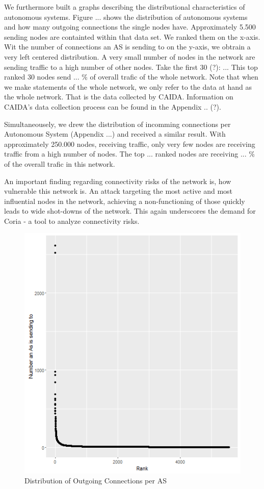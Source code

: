 \documentclass[conference]{IEEEtran}
\begin{document}
We furthermore built a graphs describing the distributional characteristics of autonomous systems. Figure ... shows the distribution of autonomous systems and how many outgoing connections the single nodes have. Approximately 5.500 sending nodes are containted within that data set. We ranked them on the x-axis. Wit the number of connections an AS is sending to on the y-axis, we obtrain a very left centered distribution. A very small number of nodes in the network are sending traffic to a high number of other nodes. Take the first 30 (?): ... This top ranked 30 nodes send ... \% of overall trafic of the whole network. Note that when we make statements of the whole network, we only refer to the data at hand as the whole network. That is the data collected by CAIDA. Information on CAIDA's data collection process can be found in the Appendix .. (?). 

Simultaneousely, we drew the distribution of incomming connections per Autonomous System (Appendix ...) and received a similar result. With approximately 250.000 nodes, receiving traffic, only very few nodes are receiving traffic from a high number of nodes. The top ... ranked nodes are receiving ... \% of the overall trafic in this network. 

An important finding regarding connectivity risks of the network is, how vulnerable this network is. An attack targeting the most active and most influential nodes in the network, achieving a non-functioning of those quickly leads to wide shot-downs of the network.  This again underscores the demand for Coria - a tool to analyze connectivity risks. 


\begin{figure}[htbp]
\centerline{\includegraphics[scale=0.4]{Graphics/AsFromDistribution.png}}
\caption{Distribution of Outgoing Connections per AS}
\label{fig}
\end{figure}
\end{document}
